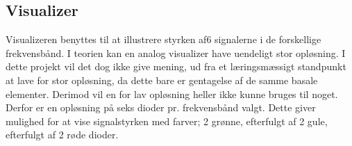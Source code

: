 
\subsection{Visualizer}
\label{visualizer}
Visualizeren benyttes til at illustrere styrken af6 signalerne i de forskellige frekvensbånd. I teorien kan en analog visualizer have uendeligt stor opløsning. I dette projekt vil det dog ikke give mening, ud fra et læringsmæssigt standpunkt at lave for stor opløsning, da dette bare er gentagelse af de samme basale elementer. Derimod vil en for lav opløsning heller ikke kunne bruges til noget. Derfor er en opløsning på seks dioder pr. frekvensbånd valgt. Dette giver mulighed for at vise signalstyrken med farver; 2 grønne, efterfulgt af 2 gule, efterfulgt af 2 røde dioder.
